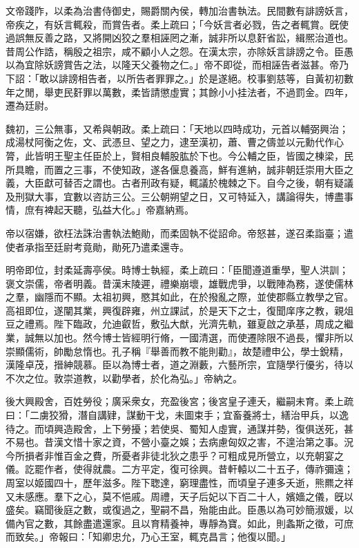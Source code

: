 \begin{pinyinscope}
文帝踐阼，以柔為治書侍御史，賜爵關內侯，轉加治書執法。民間數有誹謗妖言，帝疾之，有妖言輒殺，而賞告者。柔上疏曰；「今妖言者必戮，告之者輒賞。旣使過誤無反善之路，又將開凶狡之羣相誣罔之漸，誠非所以息姧省訟，緝熈治道也。昔周公作誥，稱殷之祖宗，咸不顧小人之怨。在漢太宗，亦除妖言誹謗之令。臣愚以為宜除妖謗賞告之法，以隆天父養物之仁。」帝不即從，而相誣告者滋甚。帝乃下詔：「敢以誹謗相告者，以所告者罪罪之。」於是遂絕。校事劉慈等，自黃初初數年之閒，舉吏民姧罪以萬數，柔皆請懲虛實；其餘小小挂法者，不過罰金。四年，遷為廷尉。

魏初，三公無事，又希與朝政。柔上疏曰：「天地以四時成功，元首以輔弼興治；成湯杖阿衡之佐，文、武憑旦、望之力，逮至漢初，蕭、曹之儔並以元勳代作心膂，此皆明王聖主任臣於上，賢相良輔股肱於下也。今公輔之臣，皆國之棟梁，民所具瞻，而置之三事，不使知政，遂各偃息養高，鮮有進納，誠非朝廷崇用大臣之義，大臣獻可替否之謂也。古者刑政有疑，輒議於槐棘之下。自今之後，朝有疑議及刑獄大事，宜數以咨訪三公。三公朝朔望之日，又可特延入，講論得失，博盡事情，庶有裨起天聽，弘益大化。」帝嘉納焉。

帝以宿嫌，欲枉法誅治書執法鮑勛，而柔固執不從詔命。帝怒甚，遂召柔詣臺；遣使者承指至廷尉考竟勛，勛死乃遣柔還寺。

明帝即位，封柔延壽亭侯。時博士執經，柔上疏曰：「臣聞遵道重學，聖人洪訓；褒文崇儒，帝者明義。昔漢末陵遲，禮樂崩壞，雄戰虎爭，以戰陣為務，遂使儒林之羣，幽隱而不顯。太祖初興，愍其如此，在於撥亂之際，並使郡縣立教學之官。高祖即位，遂闡其業，興復辟雍，州立課試，於是天下之士，復聞庠序之教，親俎豆之禮焉。陛下臨政，允迪叡哲，敷弘大猷，光濟先軌，雖夏啟之承基，周成之繼業，誠無以加也。然今博士皆經明行脩，一國清選，而使遷除限不過長，懼非所以崇顯儒術，帥勵怠惰也。孔子稱『舉善而教不能則勸』，故楚禮申公，學士銳精，漢隆卓茂，搢紳競慕。臣以為博士者，道之淵藪，六藝所宗，宜隨學行優劣，待以不次之位。敦崇道教，以勸學者，於化為弘。」帝納之。

後大興殿舍，百姓勞役；廣采衆女，充盈後宮；後宮皇子連夭，繼嗣未育。柔上疏曰：「二虜狡猾，潛自講肄，謀動干戈，未圖束手；宜畜養將士，繕治甲兵，以逸待之。而頃興造殿舍，上下勞擾；若使吳、蜀知人虛實，通謀并勢，復俱送死，甚不易也。昔漢文惜十家之資，不營小臺之娛；去病慮匈奴之害，不遑治第之事。況今所損者非惟百金之費，所憂者非徒北狄之患乎？可粗成見所營立，以充朝宴之儀。訖罷作者，使得就農。二方平定，復可徐興。昔軒轅以二十五子，傳祚彌遠；周室以姬國四十，歷年滋多。陛下聦達，窮理盡性，而頃皇子連多夭逝，熊羆之祥又未感應。羣下之心，莫不悒戚。周禮，天子后妃以下百二十人，嬪嬙之儀，旣以盛矣。竊聞後庭之數，或復過之，聖嗣不昌，殆能由此。臣愚以為可妙簡淑媛，以備內官之數，其餘盡遣還家。且以育精養神，專靜為寶。如此，則螽斯之徵，可庶而致矣。」帝報曰：「知卿忠允，乃心王室，輒克昌言；他復以聞。」


\end{pinyinscope}
